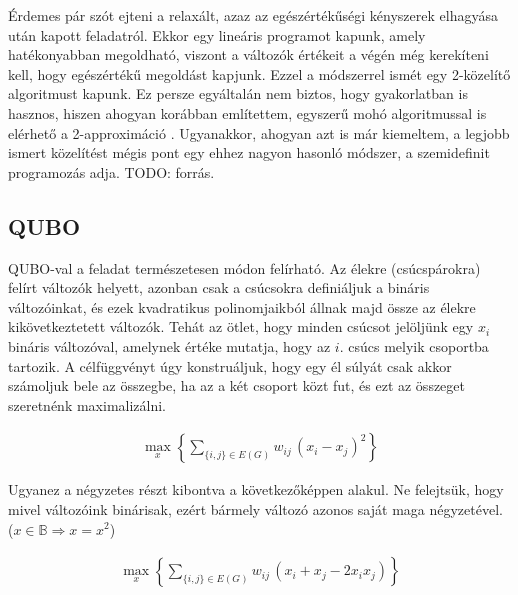 Érdemes pár szót ejteni a relaxált, azaz az egészértékűségi kényszerek elhagyása után kapott feladatról. Ekkor egy lineáris programot kapunk, amely hatékonyabban megoldható, viszont a változók értékeit a végén még kerekíteni kell, hogy egészértékű megoldást kapjunk. Ezzel a módszerrel ismét egy 2-közelítő algoritmust kapunk. Ez persze egyáltalán nem biztos, hogy gyakorlatban is hasznos, hiszen ahogyan korábban említettem, egyszerű mohó algoritmussal is elérhető a 2-approximáció \cite{10.5555/1283383.1283390, POLJAK1994191}.
Ugyanakkor, ahogyan azt is már kiemeltem, a legjobb ismert közelítést mégis pont egy ehhez nagyon hasonló módszer, a szemidefinit programozás adja. TODO: forrás.


\subsection{QUBO}\label{sec:theoryMaxCutQUBO}

QUBO-val a feladat természetesen módon felírható. Az élekre (csúcspárokra) felírt változók helyett, azonban csak a csúcsokra definiáljuk a bináris változóinkat, és ezek kvadratikus polinomjaikból állnak majd össze az élekre kikövetkeztetett változók. Tehát az ötlet, hogy minden csúcsot jelöljünk egy $x_i$ bináris változóval, amelynek értéke mutatja, hogy az $i.$ csúcs melyik csoportba tartozik. A célfüggvényt úgy konstruáljuk, hogy egy él súlyát csak akkor számoljuk bele az összegbe, ha az a két csoport közt fut, és ezt az összeget szeretnénk maximalizálni.

\begin{align}
	\max_{x} \left\{ \sum_{\{i,j\} \in E(G)}{w_{ij} \, (x_i-x_j)^2}\right\}
\end{align}

Ugyanez a négyzetes részt kibontva a következőképpen alakul. Ne felejtsük, hogy mivel változóink binárisak, ezért bármely változó azonos saját maga négyzetével. ($x \in \mathbb{B} \Rightarrow x = x^2$)

\begin{align}
	\max_{x} \left\{ \sum_{\{i,j\} \in E(G)}{w_{ij} \, (x_i+x_j-2 x_i x_j)}\right\}
\end{align}



